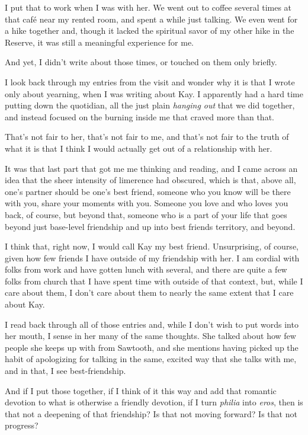 I put that to work when I was with her. We went out to coffee several times at that café near my rented room, and spent a while just talking. We even went for a hike together and, though it lacked the spiritual savor of my other hike in the Reserve, it was still a meaningful experience for me.

And yet, I didn't write about those times, or touched on them only briefly.

I look back through my entries from the visit and wonder why it is that I wrote only about yearning, when I was writing about Kay. I apparently had a hard time putting down the quotidian, all the just plain \emph{hanging out} that we did together, and instead focused on the burning inside me that craved more than that.

That's not fair to her, that's not fair to me, and that's not fair to the truth of what it is that I think I would actually get out of a relationship with her.

It was that last part that got me me thinking and reading, and I came across an idea that the sheer intensity of limerence had obscured, which is that, above all, one's partner should be one's best friend, someone who you know will be there with you, share your moments with you. Someone you love and who loves you back, of course, but beyond that, someone who is a part of your life that goes beyond just base-level friendship and up into best friends territory, and beyond.

I think that, right now, I would call Kay my best friend. Unsurprising, of course, given how few friends I have outside of my friendship with her. I am cordial with folks from work and have gotten lunch with several, and there are quite a few folks from church that I have spent time with outside of that context, but, while I care about them, I don't care about them to nearly the same extent that I care about Kay.

I read back through all of those entries and, while I don't wish to put words into her mouth, I sense in her many of the same thoughts. She talked about how few people she keeps up with from Sawtooth, and she mentions having picked up the habit of apologizing for talking in the same, excited way that she talks with me, and in that, I see best-friendship.

And if I put those together, if I think of it this way and add that romantic devotion to what is otherwise a friendly devotion, if I turn \emph{philia} into \emph{eros}, then is that not a deepening of that friendship? Is that not moving forward? Is that not progress?

